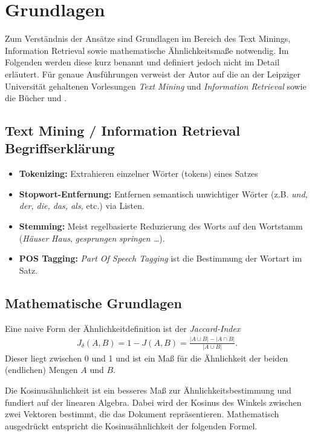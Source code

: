 \documentclass[11pt,a4paper]{article}
\newcommand{\abs}[1]{\left|#1\right|}
\begin{document}
\section{Grundlagen}

Zum Verständnis der Ansätze sind Grundlagen im Bereich des Text Minings,
Information Retrieval sowie mathematische Ähnlichkeitsmaße notwendig.  Im
Folgenden werden diese kurz benannt und definiert jedoch nicht im Detail
erläutert.  Für genaue Ausführungen verweist der Autor auf die an der
Leipziger Universität gehaltenen Vorlesungen \textit{Text Mining} und
\textit{Information Retrieval} sowie die Bücher \cite{mihalcea2006corpus} und
\cite{baeza1999modern}.

\subsection{Text Mining / Information Retrieval Begriffserklärung}

\begin{itemize}
\item \textbf{Tokenizing:} Extrahieren einzelner Wörter (tokens) eines Satzes
\item \textbf{Stopwort-Entfernung:} Entfernen semantisch unwichtiger Wörter
  (z.B. \textit{und, der, die, das, als,} etc.) via Listen.
\item \textbf{Stemming:} Meist regelbasierte Reduzierung des Worts auf den
  Wortstamm (\textit{Häuser} \textit{Haus}, \textit{gesprungen}
  \textit{springen …}).
\item \textbf{POS Tagging:} \textit{Part Of Speech Tagging} ist die Bestimmung
  der Wortart im Satz.
\end{itemize}

\subsection{Mathematische Grundlagen}

Eine naive Form der Ähnlichkeitdefinition ist der \textit{Jaccard-Index}
\cite{jaccard}
\begin{gather*}
J_\delta(A,B) = 1-J(A,B) = \frac{\abs{A\cup B}-\abs{A\cap B}}{\abs{A\cup B}}.
\end{gather*}
Dieser liegt zwischen 0 und 1 und ist ein Maß für die Ähnlichkeit der beiden
(endlichen) Mengen $A$ und $B$.
	
Die Kosinusähnlichkeit \cite{sidorov2014soft} ist ein besseres Maß zur
Ähnlichkeitsbestimmung und fundiert auf der linearen Algebra.  Dabei wird der
Kosinus des Winkels zwischen zwei Vektoren bestimmt, die das Dokument
repräsentieren.  Mathematisch ausgedrückt entspricht die Kosinusähnlichkeit
der folgenden Formel.
\end{document}
